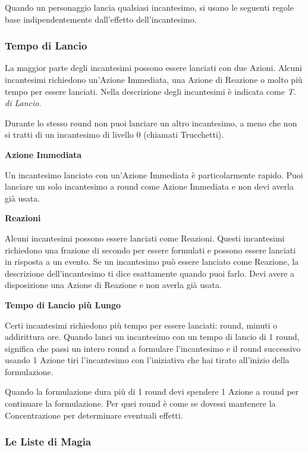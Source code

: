 \begin{multicols}{2}
Quando un personaggio lancia qualsiasi incantesimo, si usano le seguenti regole base indipendentemente dall'effetto dell'incantesimo.

\subsubsection{Tempo di Lancio}\label{magietempodilancio}\hypertarget{magietempodilancio}{}

La maggior parte degli incantesimi possono essere lanciati con due Azioni. Alcuni incantesimi richiedono un'Azione Immediata, una Azione di Reazione o molto più tempo per essere lanciati. Nella descrizione degli incantesimi è indicata come \emph{T. di Lancio}.

Durante lo stesso round non puoi lanciare un altro incantesimo, a meno che non si tratti di un incantesimo di livello 0 (chiamati Trucchetti).

\smallskip \textbf{Azione Immediata} \smallskip

Un incantesimo lanciato con un'Azione Immediata è particolarmente rapido. Puoi lanciare un solo incantesimo a round come Azione Immediata e non devi averla già usata.

\smallskip \textbf{Reazioni} \smallskip

Alcuni incantesimi possono essere lanciati come Reazioni. Questi incantesimi richiedono una frazione di secondo per essere formulati e possono essere lanciati in risposta a un evento. Se un incantesimo può essere lanciato come Reazione, la descrizione dell'incantesimo ti dice esattamente quando puoi farlo. Devi avere a disposizione una Azione di Reazione e non averla già usata.

\smallskip \textbf{Tempo di Lancio più Lungo} \smallskip

Certi incantesimi richiedono più tempo per essere lanciati: round, minuti o addirittura ore.
Quando lanci un incantesimo con un tempo di lancio di 1 round, significa che passi un intero round a formulare l'incantesimo e il round successivo usando 1 Azione tiri l'incantesimo con l'iniziativa che hai tirato all'inizio della formulazione.

Quando la formulazione dura più di 1 round devi spendere 1 Azione a round per continuare la formulazione. Per quei round è come se dovessi mantenere la Concentrazione per determinare eventuali effetti.

\subsubsection{Le Liste di Magia}\hypertarget{lescuoledimagia}{} \label{magielistadimagia}


\end{multicols}
